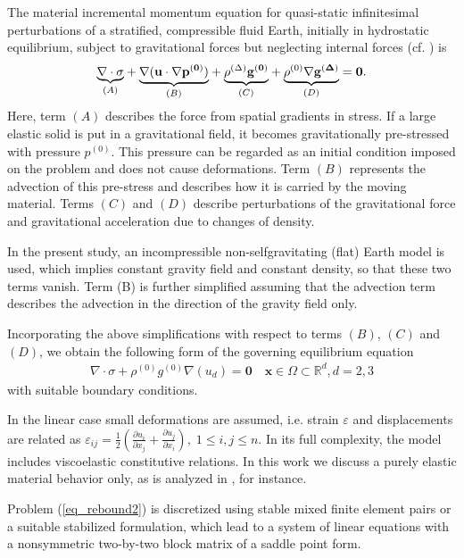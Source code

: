\documentclass{report}
\begin{document}
The
material incremental momentum equation for quasi-static infinitesimal
perturbations of a stratified, compressible fluid Earth, initially in
hydrostatic equilibrium, subject to gravitational forces but
neglecting internal forces (cf. \cite{KlemannWuWolf}) is
$$
\underset{(A)}{\underbrace{\nabla\cdot\sigma}} +
\underset{(B)}{\underbrace{\nabla(\bf{u}\cdot\nabla p^{(0)})}} +
\underset{(C)}{\underbrace{\rho^{(\Delta)}\bf{g}^{(0)}}} +
\underset{(D)}{\underbrace{\rho^{(0)}\nabla\bf{g}^{(\Delta)}}} = \bf{0}.
$$
Here, term $(A)$ describes the force from spatial gradients in stress.
If a large elastic solid is put in a gravitational field, it becomes
gravitationally pre-stressed with pressure $p^{(0)}$. This pressure
can be regarded as an initial condition imposed on the problem and
does not cause deformations. Term $(B)$ represents the advection of
this pre-stress and describes how it is carried by the moving
material.
Terms $(C)$ and $(D)$ describe perturbations of the gravitational
force and gravitational acceleration due to changes of density.

In the present study, an incompressible non-selfgravitating (flat) Earth
model is used, which implies constant gravity field and constant density,
so that these two terms vanish. Term (B)
is further simplified assuming that the advection term describes the advection
in the direction of the gravity field only.

Incorporating the above simplifications with respect to terms
$(B)$, $(C)$ and $(D)$, we obtain the following form of the governing
equilibrium equation
\begin{equation}
\begin{array}{l}
\nabla\cdot \sigma +
\rho^{(0)}g^{(0)} \nabla(u_d) = \mathbf{0} \quad
\mathbf{x}\in\Omega\subset\mathbb{R}^d, d=2,3
\end{array}
\label{eq_rebound2}
\end{equation}
with suitable boundary conditions.

In the linear case small deformations are assumed, i.e. strain
$\varepsilon$ and displacements are related as
$
\varepsilon_{ij} = \frac{1}{2}\left(\frac{\partial u_i}{\partial x_j} +
\frac{\partial u_j}{\partial x_i}\right), \; 1\le i,j\le n.
$
In its full complexity, the model includes viscoelastic constitutive relations.
In this work we discuss a purely elastic material behavior only,
as is analyzed
in \cite{KlemannWuWolf}, for instance.


Problem (\ref{eq_rebound2}) is discretized using stable mixed finite
element pairs or a suitable stabilized formulation,
which lead to a system of linear equations with a nonsymmetric
two-by-two block
matrix of a saddle point form.
\end{document}
